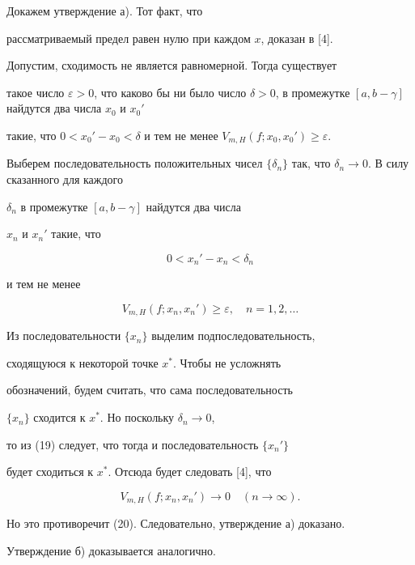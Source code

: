 \begin{pf}


Докажем утверждение а). Тот факт, что


рассматриваемый предел равен нулю при каждом $x$, доказан в [4].


Допустим, сходимость не является равномерной. Тогда существует 


такое число $\varepsilon>0$, что каково бы ни было число $\delta>


0$, в промежутке $[a,b-\gamma]$ найдутся два числа $x_0$ и $x_0'$


такие, что $0<x_0'-x_0<\delta$ и тем не менее $V_{m,H}(f;x_0,


x_0')\ge\varepsilon$.





Выберем последовательность положительных чисел $\{\delta_


n\}$ так, что $\delta_n\to 0$. В силу сказанного для каждого 


$\delta_n$ в промежутке $[a,b-\gamma]$ найдутся два числа 


$x_n$ и $x_n'$ такие, что


\begin{equation}


0<x_n'-x_n<\delta_n


\end{equation}


и тем не менее 


\begin{equation}


V_{m,H}(f;x_n,x_n')\ge\varepsilon,\quad n=1,2,\dotsc


\end{equation}





Из последовательности $\{x_n\}$ выделим подпоследовательность,


сходящуюся к некоторой точке $x^*$. Чтобы не усложнять 


обозначений, будем считать, что сама последовательность  


$\{x_n\}$ сходится к $x^*$. Но поскольку $\delta_n\to 0$,


то из (19) следует, что тогда и последовательность $\{x_n'\}$


будет сходиться к $x^*$. Отсюда будет следовать [4], что


$$


V_{m,H}(f;x_n,x_n')\to 0\quad (n\to\infty).


$$


Но это противоречит (20). Следовательно, утверждение а) доказано.


Утверждение б) доказывается аналогично.


\end{pf}





